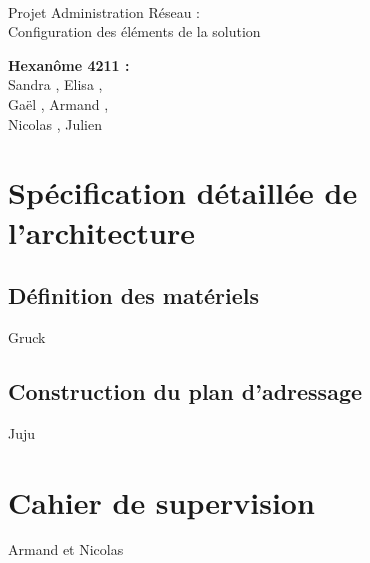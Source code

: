 \documentclass[a4paper]{article}
\begin{document}
\begin{titlepage}
	~ 
	\vfill
	\begin{center}
		\begin{Huge}
			Projet Administration Réseau : \\ Configuration des éléments de la solution\\
		\end{Huge}
	\vfill
		\textbf{Hexanôme 4211 :} 
			\\Sandra {}, Elisa , 
			\\Gaël , Armand , 
			\\Nicolas {}, Julien \\
	\vfill
	\end{center}
	\vfill
\end{titlepage}

\newpage
\tableofcontents
\newpage

\section{Spécification détaillée de l'architecture}
	\subsection{Définition des matériels}
	Gruck
	
	\subsection{Construction du plan d'adressage}
	Juju
	
\section{Cahier de supervision}
	Armand et Nicolas
\end{document}
